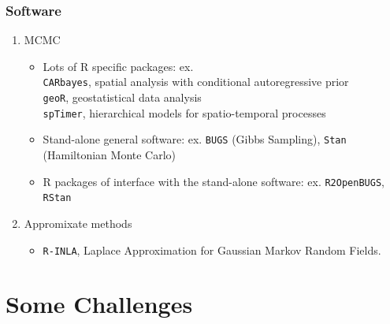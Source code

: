 \documentclass[slidestop,compress,serif,10pt]{beamer}
\begin{document}
\begin{frame}\frametitle{Software}
\begin{enumerate}
\vfill\item MCMC
\begin{itemize}
\item Lots of R specific packages: ex.\\ 
\texttt{CARbayes}, spatial analysis with conditional autoregressive prior\\
\texttt{geoR}, geostatistical data analysis\\ 
\texttt{spTimer}, hierarchical models for spatio-temporal processes\\
\item Stand-alone general software: ex. \texttt{BUGS} (Gibbs Sampling), \texttt{Stan} (Hamiltonian Monte Carlo)
\item R packages of interface with the stand-alone software: ex. \texttt{R2OpenBUGS}, \texttt{RStan}
\end{itemize}
\vfill\item Appromixate methods
\begin{itemize}
\item \texttt{R-INLA}, Laplace Approximation for Gaussian Markov Random Fields.
\end{itemize}
\end{enumerate} 
\end{frame}
\section{Some Challenges}
\end{document}
